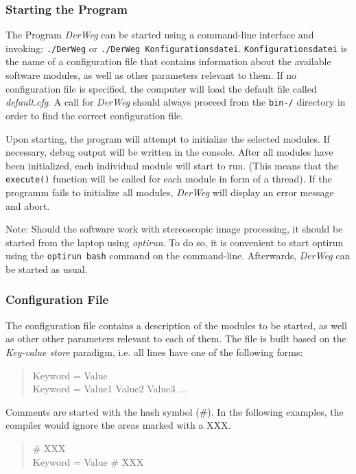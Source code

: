 \documentclass[a4paper, 11pt]{article}
\newcommand{\code}[1]{\texttt{#1}}
\newcommand{\DerWeg}{\textit{DerWeg }} %
\begin{document}
\subsubsection{Starting the Program}

The Program \DerWeg can be started using a command-line interface and invoking: \texttt{./DerWeg} or \texttt{./DerWeg Konfigurationsdatei}. \texttt{Konfigurationsdatei} is the name of a configuration file that contains information about the available software modules, as well as other parameters relevant to them. If no configuration file is specified, the computer will load the default file called \textit{default.cfg}. A call for \DerWeg should always proceed from the \texttt{bin-/} directory in order to find the correct configuration file. 

Upon starting, the program will attempt to initialize the selected modules. If necessary, debug output will be written in the console. After all modules have been initialized, each individual module will start to run. (This means that the \code{execute()} function will be called for each module in form of a thread). If the programm fails to initialize all modules, \DerWeg will display an error message and abort.

Note: Should the software work with stereoscopic image processing, it should be started from the laptop using \textit{optirun}. To do so, it is convenient to start optirun using the \texttt{optirun bash} command on the command-line. Afterwards, \DerWeg can be started as usual.

\subsubsection{Configuration File}
\label{sec:config}

The configuration file contains a description of the modules to be started, as well as other other parameters relevant to each of them. The file is built based on the \textit{Key-value store} paradigm, i.e. all lines have one of the following forms:
\begin{quote}
Keyword = Value\\
Keyword = Value1 Value2 Value3 ...
\end{quote}
Comments are started with the hash symbol (\#). In the following examples, the compiler would ignore the areas marked with a XXX. 
\begin{quote}
\# XXX\\
Keyword = Value \# XXX
\end{quote}
\end{document}
